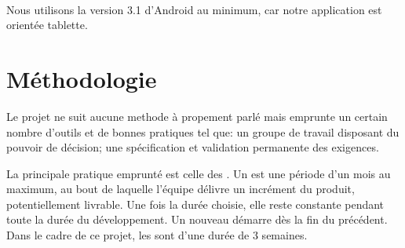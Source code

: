 \paragraph{}Nous utilisons la version 3.1 d'Android au minimum, car notre application est orientée tablette.
\section{Méthodologie}
Le projet ne suit aucune methode \agile{} à propement parlé mais emprunte un certain nombre d'outils et de \og{}bonnes pratiques\fg{} tel que: un \og{}groupe de travail disposant du pouvoir de décision\fg{}; une \og{}spécification et validation permanente des exigences\fg{}.

La principale pratique emprunté est celle des \sprint{}. Un \sprint{} est une période d'un mois au maximum, au bout de laquelle l'équipe délivre un incrément du produit, potentiellement livrable. Une fois la durée choisie, elle reste constante pendant toute la durée du développement. Un nouveau \sprint{} démarre dès la fin du précédent. Dans le cadre de ce projet, les \sprint{} sont d'une durée de 3 semaines.
